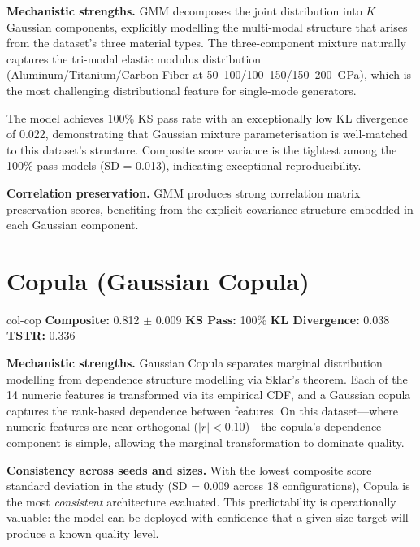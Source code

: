 \documentclass[11pt, a4paper]{report}
\begin{document}
\textbf{Mechanistic strengths.} GMM decomposes the joint distribution into $K$ Gaussian components, explicitly modelling the multi-modal structure that arises from the dataset's three material types. The three-component mixture naturally captures the tri-modal elastic modulus distribution (Aluminum/Titanium/Carbon Fiber at 50--100/100--150/150--200~GPa), which is the most challenging distributional feature for single-mode generators.

The model achieves 100\% KS pass rate with an exceptionally low KL divergence of 0.022, demonstrating that Gaussian mixture parameterisation is well-matched to this dataset's structure. Composite score variance is the tightest among the 100\%-pass models (SD = 0.013), indicating exceptional reproducibility.

\textbf{Correlation preservation.} GMM produces strong correlation matrix preservation scores, benefiting from the explicit covariance structure embedded in each Gaussian component.

\section{\textcolor{col-cop}{Copula (Gaussian Copula)}}

\begin{modelbox}[title={\textbf{Copula} --- 18 configurations, 3 seeds $\times$ 4 sizes (+ 6 regularised)}]{col-cop}
\textbf{Composite:} 0.812 $\pm$ 0.009 \quad \textbf{KS Pass:} 100\% \quad \textbf{KL Divergence:} 0.038 \quad \textbf{TSTR:} 0.336
\end{modelbox}

\textbf{Mechanistic strengths.} Gaussian Copula separates marginal distribution modelling from dependence structure modelling via Sklar's theorem. Each of the 14 numeric features is transformed via its empirical CDF, and a Gaussian copula captures the rank-based dependence between features. On this dataset---where numeric features are near-orthogonal ($|r| < 0.10$)---the copula's dependence component is simple, allowing the marginal transformation to dominate quality.

\textbf{Consistency across seeds and sizes.} With the lowest composite score standard deviation in the study (SD = 0.009 across 18 configurations), Copula is the most \emph{consistent} architecture evaluated. This predictability is operationally valuable: the model can be deployed with confidence that a given size target will produce a known quality level.
\end{document}
